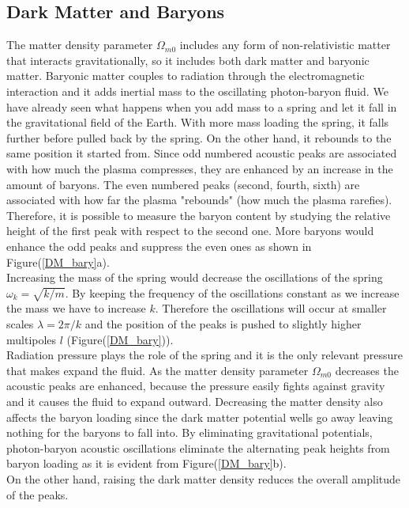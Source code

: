\documentclass{article}
\begin{document}
\subsection{Dark Matter and Baryons}
The matter density parameter $\Omega_{m0}$ includes any form of non-relativistic matter that interacts gravitationally, so it includes both dark matter and baryonic matter.
Baryonic matter couples to radiation through the electromagnetic interaction and it adds inertial mass to the oscillating photon-baryon fluid.
We have already seen what happens when you add mass to a spring and let it fall in the gravitational field of the Earth.  
With more mass loading the spring, it falls further before pulled back by the spring. 
On the other hand, it rebounds to the same position it started from. 
Since odd numbered acoustic peaks are associated with how much the plasma compresses, they are enhanced by an increase in the amount of baryons.
The even numbered peaks (second, fourth, sixth) are associated with how far the plasma "rebounds" (how much the plasma rarefies).
Therefore, it is possible to measure the baryon content by studying the relative height of the first peak with respect to the second one.
More baryons would enhance the odd peaks and suppress the even ones as shown in Figure(\ref{DM_bary}a).\\
Increasing the mass of the spring would decrease the oscillations of the spring $\omega_k = \sqrt{k/m}$.
By keeping the frequency of the oscillations constant as we increase the mass we have to increase $k$.
Therefore the oscillations will occur at smaller scales $\lambda =2 \pi /k$ and the position of the peaks is pushed to slightly higher multipoles $l$ (Figure(\ref{DM_bary})).\\
Radiation pressure plays the role of the spring and it is the only relevant pressure that makes expand the fluid.
As the matter density parameter $\Omega_{m0}$ decreases the acoustic peaks are enhanced, because the pressure easily fights against gravity and it causes the fluid to expand outward.
Decreasing the matter density also affects the baryon loading since the dark matter potential wells go away leaving nothing for the baryons to fall into.
By eliminating gravitational potentials, photon-baryon acoustic oscillations eliminate the alternating peak heights from baryon loading \cite{huCosmicMicrowaveBackground2001} as it is evident from Figure(\ref{DM_bary}b).\\
On the other hand, raising the dark matter density reduces the overall amplitude of the peaks.
\end{document}

